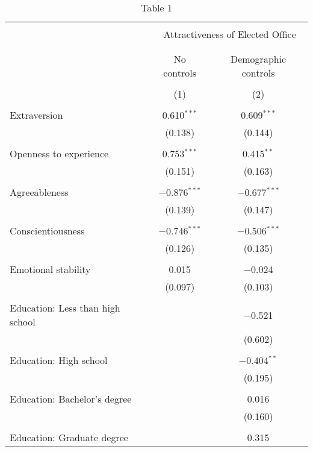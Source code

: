 
\begin{table}[!htbp] \centering 
  \caption{Table 1} 
  \label{} 
\begin{tabular}{@{\extracolsep{5pt}}lcc} 
\\[-1.8ex]\hline 
\hline \\[-1.8ex] 
 & \multicolumn{2}{c}{Attractiveness of Elected Office} \\ 
\cline{2-3} 
\\[-1.8ex] & \multicolumn{2}{c}{} \\ 
 & No controls & Demographic controls \\ 
\\[-1.8ex] & (1) & (2)\\ 
\hline \\[-1.8ex] 
 Extraversion & 0.610$^{***}$ & 0.609$^{***}$ \\ 
  & (0.138) & (0.144) \\ 
  & & \\ 
 Openness to experience & 0.753$^{***}$ & 0.415$^{**}$ \\ 
  & (0.151) & (0.163) \\ 
  & & \\ 
 Agreeableness & $-$0.876$^{***}$ & $-$0.677$^{***}$ \\ 
  & (0.139) & (0.147) \\ 
  & & \\ 
 Conscientiousness & $-$0.746$^{***}$ & $-$0.506$^{***}$ \\ 
  & (0.126) & (0.135) \\ 
  & & \\ 
 Emotional stability & 0.015 & $-$0.024 \\ 
  & (0.097) & (0.103) \\ 
  & & \\ 
 Education: Less than high school &  & $-$0.521 \\ 
  &  & (0.602) \\ 
  & & \\ 
 Education: High school &  & $-$0.404$^{**}$ \\ 
  &  & (0.195) \\ 
  & & \\ 
 Education: Bachelor's degree &  & 0.016 \\ 
  &  & (0.160) \\ 
  & & \\ 
 Education: Graduate degree &  & 0.315 \\ 

\end{tabular}
\end{table}
